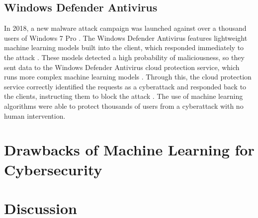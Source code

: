 \subsection{Windows Defender Antivirus}
In 2018, a new malware attack campaign was launched against over a thousand users of Windows 7 Pro \cite{microsoft2018}.
The Windows Defender Antivirus features lightweight machine learning models built into the client, which responded immediately to the attack \cite{microsoft2018}.
These models detected a high probability of maliciousness, so they sent data to the Windows Defender Antivirus cloud protection service, which runs more complex machine learning models \cite{microsoft2018}.
Through this, the cloud protection service correctly identified the requests as a cyberattack and responded back to the clients, instructing them to block the attack \cite{microsoft2018}.
The use of machine learning algorithms were able to protect thousands of users from a cyberattack with no human intervention.

\section{Drawbacks of Machine Learning for Cybersecurity}

\section{Discussion}
